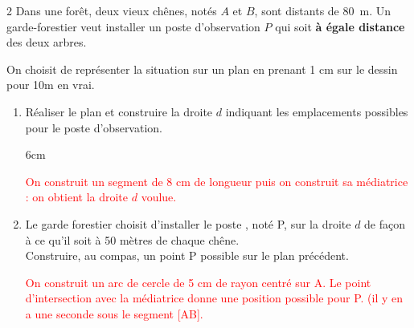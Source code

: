 \documentclass[a4paper]{book}
\begin{document}
{    \begin{exerciceNote}{2}
        Dans une forêt, deux vieux chênes, notés $A$ et $B$, sont distants de $80$~m. Un garde-forestier veut installer un poste d'observation $P$ qui soit \textbf{à égale distance} des deux arbres.

        On choisit de représenter la situation sur un plan en prenant 1 cm sur le dessin pour 10m en vrai.

        \begin{enumerate}
            \item Réaliser le plan et construire la droite $d$ indiquant les emplacements possibles pour le poste d'observation.

            \begin{ZoneReponse}{6cm}
                \begin{center}
                \end{center}

                \textcolor{red}{On construit un segment de 8 cm de longueur puis on construit sa médiatrice : on obtient la droite $d$ voulue.}
            \end{ZoneReponse}

            \item Le garde forestier choisit d'installer le poste , noté P, sur la droite $d$ de façon à ce qu'il soit à 50 mètres de chaque chêne.\\
            Construire, au compas, un point P possible sur le plan précédent.

            \textcolor{red}{On construit un arc de cercle de 5 cm de rayon centré sur A. Le point d'intersection avec la médiatrice donne une position possible pour P. (il y en a une seconde \og sous \fg le segment [AB].}
        \end{enumerate}
    \end{exerciceNote}
    
}
\end{document}
